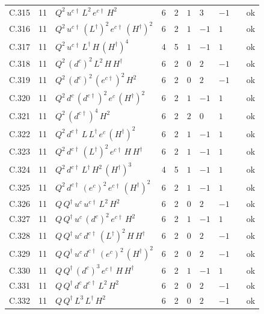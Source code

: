 {\begin{longtable}{@{}ll>{\raggedright\arraybackslash}p{6.4cm}rrllllr@{}}
C.315 & 11 & $Q^{2}\,u^{c\dagger}\,L^{2}\,e^{c\dagger}\,H^{2}$ & 6 & 2 & $1$ & $3$ & $-1$ &  & ok \\
C.316 & 11 & $Q^{2}\,u^{c\dagger}\,(L^\dagger)^{2}\,e^{c\dagger}\,(H^\dagger)^{2}$ & 6 & 2 & $1$ & $-1$ & $1$ &  & ok \\
C.317 & 11 & $Q^{2}\,u^{c\dagger}\,L^\dagger\,H\,(H^\dagger)^{4}$ & 4 & 5 & $1$ & $-1$ & $1$ &  & ok \\
C.318 & 11 & $Q^{2}\,(d^c)^{2}\,L^{2}\,H\,H^\dagger$ & 6 & 2 & $0$ & $2$ & $-1$ &  & ok \\
C.319 & 11 & $Q^{2}\,(d^c)^{2}\,(e^{c\dagger})^{2}\,H^{2}$ & 6 & 2 & $0$ & $2$ & $-1$ &  & ok \\
C.320 & 11 & $Q^{2}\,d^c\,(d^{c\dagger})^{2}\,e^c\,(H^\dagger)^{2}$ & 6 & 2 & $1$ & $-1$ & $1$ &  & ok \\
C.321 & 11 & $Q^{2}\,(d^{c\dagger})^{4}\,H^{2}$ & 6 & 2 & $2$ & $0$ & $1$ &  & ok \\
C.322 & 11 & $Q^{2}\,d^{c\dagger}\,L\,L^\dagger\,e^c\,(H^\dagger)^{2}$ & 6 & 2 & $1$ & $-1$ & $1$ &  & ok \\
C.323 & 11 & $Q^{2}\,d^{c\dagger}\,(L^\dagger)^{2}\,e^{c\dagger}\,H\,H^\dagger$ & 6 & 2 & $1$ & $-1$ & $1$ &  & ok \\
C.324 & 11 & $Q^{2}\,d^{c\dagger}\,L^\dagger\,H^{2}\,(H^\dagger)^{3}$ & 4 & 5 & $1$ & $-1$ & $1$ &  & ok \\
C.325 & 11 & $Q^{2}\,d^{c\dagger}\,(e^c)^{2}\,e^{c\dagger}\,(H^\dagger)^{2}$ & 6 & 2 & $1$ & $-1$ & $1$ &  & ok \\
C.326 & 11 & $Q\,Q^\dagger\,u^c\,u^{c\dagger}\,L^{2}\,H^{2}$ & 6 & 2 & $0$ & $2$ & $-1$ &  & ok \\
C.327 & 11 & $Q\,Q^\dagger\,u^c\,(d^c)^{2}\,e^{c\dagger}\,H^{2}$ & 6 & 2 & $1$ & $-1$ & $1$ &  & ok \\
C.328 & 11 & $Q\,Q^\dagger\,u^c\,d^{c\dagger}\,(L^\dagger)^{2}\,H\,H^\dagger$ & 6 & 2 & $0$ & $2$ & $-1$ &  & ok \\
C.329 & 11 & $Q\,Q^\dagger\,u^c\,d^{c\dagger}\,(e^c)^{2}\,(H^\dagger)^{2}$ & 6 & 2 & $0$ & $2$ & $-1$ &  & ok \\
C.330 & 11 & $Q\,Q^\dagger\,(d^c)^{3}\,e^{c\dagger}\,H\,H^\dagger$ & 6 & 2 & $1$ & $-1$ & $1$ &  & ok \\
C.331 & 11 & $Q\,Q^\dagger\,d^c\,d^{c\dagger}\,L^{2}\,H^{2}$ & 6 & 2 & $0$ & $2$ & $-1$ &  & ok \\
C.332 & 11 & $Q\,Q^\dagger\,L^{3}\,L^\dagger\,H^{2}$ & 6 & 2 & $0$ & $2$ & $-1$ &  & ok \\

\end{longtable}}
